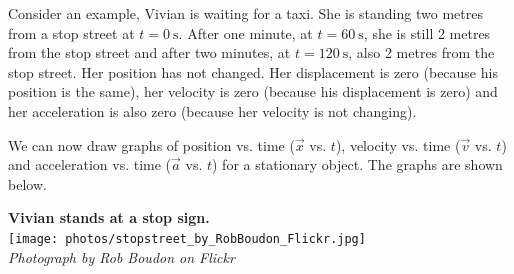 \begin{minipage}{.5\textwidth}
        \label{m38795*id69021}Consider an example, Vivian is waiting for a taxi. She is standing two metres from a stop street at $t=0~\text{s}$. After one minute, at $t=60~\text{s}$, she is still 2 metres from the stop street and after two minutes, at $t=120~\text{s}$, also 2 metres from the stop street. Her position has not changed. Her displacement is zero (because his position is the same), her velocity is zero (because his displacement is zero) and her acceleration is also zero (because her velocity is not changing).

        \label{m38795*id69081}We can now draw graphs of position vs. time ($\vec{x}$ vs. $t$), velocity vs. time ($\vec{v}$ vs. $t$) and acceleration vs. time ($\vec{a}$ vs. $t$) for a stationary object. The graphs are shown below.
\end{minipage}
\begin{minipage}{.5\textwidth}
\begin{center}
 \textbf{Vivian stands at a stop sign.}\\
\texttt{[image: photos/stopstreet\_by\_RobBoudon\_Flickr.jpg]}\\
\textit{Photograph by Rob Boudon on Flickr}
\end{center}
\end{minipage}

